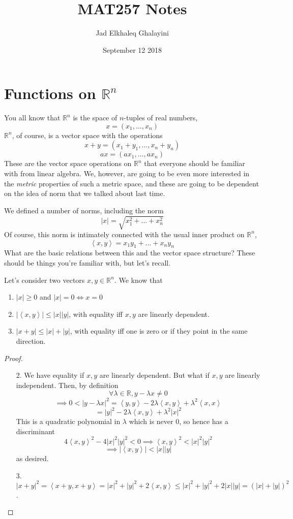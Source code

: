 \documentclass{article}
\title{MAT257 Notes}
\author{Jad Elkhaleq Ghalayini}
\date{September 12 2018}
\newcommand{\reals}[0]{\mathbb{R}}
\newcommand{\ip}[2]{\left\langle#1,#2\right\rangle}
\begin{document}
\maketitle

\section*{Functions on \(\reals^n\)}

You all know that \(\reals^n\) is the space of \(n\)-tuples of real numbers,
\[x = (x_1,...,x_n)\]
\(\reals^n\), of course, is a vector space with the operations
\[x + y = (x_1 + y_1,...,x_n + y_n)\]
\[ax = (ax_1,...,ax_n)\]
These are the vector space operations on \(\reals^n\) that everyone should be familiar with from linear algebra. We, however, are going to be even more interested in the \textit{metric} properties of such a metric space, and these are going to be dependent on the idea of norm that we talked about last time.

We defined a number of norms, including the norm
\[|x| = \sqrt{x_1^2 + ... + x_n^2}\]
Of course, this norm is intimately connected with the usual inner product on \(\reals^n\),
\[\ip{x}{y} = x_1y_1 + ... + x_ny_n\]
What are the basic relations between this and the vector space structure? These should be things you're familiar with, but let's recall.

Let's consider two vectors \(x, y \in \reals^n\). We know that
\begin{enumerate}
  \item \(|x| \geq 0\) and \(|x| = 0 \iff x = 0\)
  \item \(|\ip{x}{y}| \leq |x||y|\), with equality iff \(x, y\) are linearly dependent.
  \item \(|x + y| \leq |x| + |y|\), with equality iff one is zero or if they point in the same direction.
\end{enumerate}
\begin{proof}
\begin{itemize}

  \item [2.] We have equality if \(x, y\) are linearly dependent. But what if \(x, y\) are linearly independent. Then, by definition
  \[\forall \lambda \in \reals, y - \lambda x \neq 0\]
  \[\implies 0 < |y - \lambda x|^2
  = \ip{y}{y} - 2\lambda\ip{x}{y} + \lambda^2\ip{x}{x}\]
  \[= |y|^2 - 2\lambda\ip{x}{y} + \lambda^2|x|^2\]
  This is a quadratic polynomial in \(\lambda\) which is never 0, so hence has a discriminant
  \[4\ip{x}{y}^2 - 4|x|^2|y|^2 < 0 \implies \ip{x}{y}^2 < |x|^2|y|^2\]
  \[\implies |\ip{x}{y}| < |x||y|\]
  as desired.

  \item [3.] \(|x + y|^2  = \ip{x + y}{x + y} = |x|^2 + |y|^2 + 2\ip{x}{y}
  \leq |x|^2 + |y|^2 + 2|x||y| = (|x| + |y|)^2\).
\end{itemize}
\end{proof}
\end{document}
